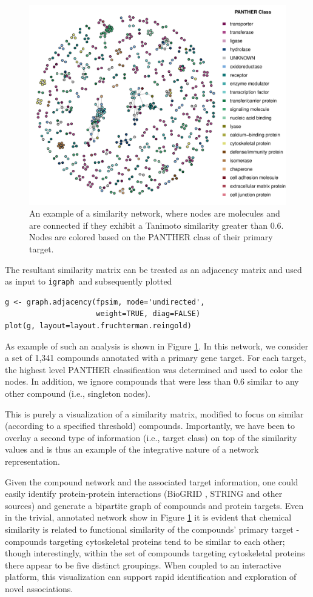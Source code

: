 \documentclass[]{book}
\newcommand{\igraph}{\texttt{igraph}\ }
\begin{document}
\begin{figure}[h]
  \centering
  \includegraphics[width=0.75\linewidth]{img/sim-network-connected}
  \caption{An example of a similarity network, where nodes are
    molecules and are connected if they exhibit a Tanimoto similarity
    greater than 0.6. Nodes are colored based on the PANTHER
    \cite{Mi:2005qq} class of their primary target.}
  \label{fig:simnet}
\end{figure}

The resultant similarity matrix can be treated as an adjacency matrix
and used as input to \igraph and subsequently plotted
\begin{lstlisting}
g <- graph.adjacency(fpsim, mode='undirected', 
                     weight=TRUE, diag=FALSE)
plot(g, layout=layout.fruchterman.reingold)
\end{lstlisting}
As example of such an analysis is shown in Figure \ref{fig:simnet}. In
this network, we consider a set of 1,341 compounds annotated with a
primary gene target. For each target, the highest level PANTHER
\cite{Mi:2005qq} classification was determined and used to color the
nodes. In addition, we ignore compounds that were less than 0.6
similar to any other compound (i.e., singleton nodes).

This is purely a visualization of a similarity matrix,
modified to focus on similar (according to a specified threshold)
compounds. Importantly, we have been to overlay a second type of
information (i.e., target class) on top of the similarity values and
is thus an example of the integrative nature of a network
representation.

Given the compound network and the associated target information, one
could easily identify protein-protein interactions (BioGRID
\cite{Chatr-Aryamontri:2015yf}, STRING \cite{Franceschini:2013qa} and
other sources) and generate a bipartite graph of compounds and protein
targets. Even in the trivial, annotated network show in Figure
\ref{fig:simnet} it is evident that chemical similarity is related to
functional similarity of the compounds' primary target - compounds
targeting cytoskeletal proteins tend to be similar to each other;
though interestingly, within the set of compounds targeting
cytoskeletal proteins there appear to be five distinct groupings. When
coupled to an interactive platform, this visualization can support
rapid identification and exploration of novel associations.
\end{document}

